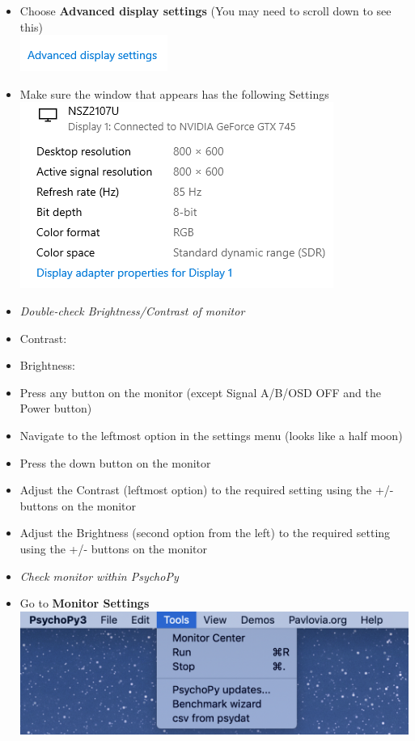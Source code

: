 \documentclass[]{article}
\begin{document}
\begin{itemize}
\item
  Choose \textbf{Advanced display settings} (You may need to scroll down
  to see this)\\
  \includegraphics{images/DS4.PNG}\\
\item
  Make sure the window that appears has the following Settings\\
  \includegraphics{images/ds5.PNG}\\
\item
  \emph{Double-check Brightness/Contrast of monitor}
\item
  Contrast:
\item
  Brightness:
\item
  Press any button on the monitor (except Signal A/B/OSD OFF and the
  Power button)
\item
  Navigate to the leftmost option in the settings menu (looks like a
  half moon)
\item
  Press the down button on the monitor
\item
  Adjust the Contrast (leftmost option) to the required setting using
  the +/- buttons on the monitor
\item
  Adjust the Brightness (second option from the left) to the required
  setting using the +/- buttons on the monitor
\item
  \emph{Check monitor within PsychoPy}\\
\item
  Go to \textbf{Monitor Settings}\\
  \includegraphics{images/pp2.png}\\

\end{itemize}
\end{document}
